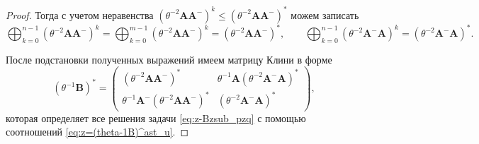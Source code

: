 \documentclass[specialist,
               substylefile = spbu.rtx,
               subf,href,colorlinks=true, 12pt]{disser}
\theoremstyle{definition}
\begin{document}
\begin{proof}
Тогда с учетом неравенства $(\theta^{-2}\bm{A}\bm{A}^{-})^{k}\leq(\theta^{-2}\bm{A}\bm{A}^{-})^{\ast}$ можем записать
\begin{equation*}
\bigoplus_{k=0}^{n-1}(\theta^{-2}\bm{A}\bm{A}^{-})^{k}
=
\bigoplus_{k=0}^{m-1}(\theta^{-2}\bm{A}\bm{A}^{-})^{k}
=
(\theta^{-2}\bm{A}\bm{A}^{-})^{\ast},
\qquad
\bigoplus_{k=0}^{n-1}(\theta^{-2}\bm{A}^{-}\bm{A})^{k}
=
(\theta^{-2}\bm{A}^{-}\bm{A})^{\ast}.
\end{equation*}

После подстановки полученных выражений имеем матрицу Клини в форме
\begin{equation*}
(\theta^{-1}\bm{B})^{\ast}
=
\begin{pmatrix}
(\theta^{-2}\bm{A}\bm{A}^{-})^{\ast} &\theta^{-1}\bm{A}(\theta^{-2}\bm{A}^{-}\bm{A})^{\ast}\\
\theta^{-1}\bm{A}^{-}(\theta^{-2}\bm{A}\bm{A}^{-})^{\ast} &(\theta^{-2}\bm{A}^{-}\bm{A})^{\ast}
\end{pmatrix},
\end{equation*}
которая определяет все решения задачи \eqref{eq:z-Bzsub_pzq} с помощью соотношений \eqref{eq:z=(theta-1B)^ast_u}.


\end{proof}
\end{document}
